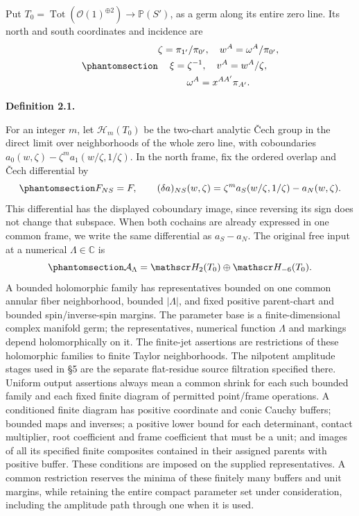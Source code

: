 \documentclass[
  english,
  11pt,
  reqno]{amsart}
\makeatletter
\newcommand{\pandocstatementheading}[1]{%
  \par\addpenalty{\@beginparpenalty}%
  \addvspace{.5\baselineskip plus .2\baselineskip minus .2\baselineskip}%
  {\normalfont\bfseries #1\par}%
  \nobreak\@afterindenttrue\@afterheading
}
\makeatother
\begin{document}
Put \(T_0=\operatorname{Tot}(\mathcal O(1)^{\oplus2})\to\mathbb P(S')\),
as a germ along its entire zero line. Its north and south coordinates
and incidence are
\begin{equation}\protect\phantomsection\label{eq:gg-flat-incidence}{\begin{gathered}
\zeta=\pi_{1'}/\pi_{0'},\quad
 w^A=\omega^A/\pi_{0'}, \\
\xi=\zeta^{-1},\quad v^A=w^A/\zeta, \\
\omega^A=x^{AA'}\pi_{A'}.
\end{gathered}}\end{equation}

\pandocstatementheading{\protect{}\label{def:gg-original-input}Definition 2.1.}

For an integer \(m\), let \(\mathscr H_m(T_0)\) be the two-chart
analytic Čech group in the direct limit over neighborhoods of the whole
zero line, with coboundaries
\(a_0(w,\zeta)-\zeta^m a_1(w/\zeta,1/\zeta)\). In the north frame, fix
the ordered overlap and Čech differential by
\begin{equation}\protect\phantomsection\label{eq:gg-original-cech-orientation}{
 F_{NS}=F,\qquad
 (\delta a)_{NS}(w,\zeta)
   =\zeta^m a_S(w/\zeta,1/\zeta)-a_N(w,\zeta).
}\end{equation} This differential has the displayed coboundary image,
since reversing its sign does not change that subspace. When both
cochains are already expressed in one common frame, we write the same
differential as \(a_S-a_N\). The original free input at a numerical
\(\Lambda\in\mathbb C\) is
\begin{equation}\protect\phantomsection\label{eq:gg-original-input}{
 \mathcal A_\Lambda=\mathscr H_2(T_0)\oplus\mathscr H_{-6}(T_0).
}\end{equation} A bounded holomorphic family has representatives bounded
on one common annular fiber neighborhood, bounded \(|\Lambda|\), and
fixed positive parent-chart and bounded spin/inverse-spin margins. The
parameter base is a finite-dimensional complex manifold germ; the
representatives, numerical function \(\Lambda\) and markings depend
holomorphically on it. The finite-jet assertions are restrictions of
these holomorphic families to finite Taylor neighborhoods. The nilpotent
amplitude stages used in §5 are the separate flat-residue source
filtration specified there. Uniform output assertions always mean a
common shrink for each such bounded family and each fixed finite diagram
of permitted point/frame operations. A conditioned finite diagram has
positive coordinate and conic Cauchy buffers; bounded maps and inverses;
a positive lower bound for each determinant, contact multiplier, root
coefficient and frame coefficient that must be a unit; and images of all
its specified finite composites contained in their assigned parents with
positive buffer. These conditions are imposed on the supplied
representatives. A common restriction reserves the minima of these
finitely many buffers and unit margins, while retaining the entire
compact parameter set under consideration, including the amplitude path
through one when it is used.
\end{document}
